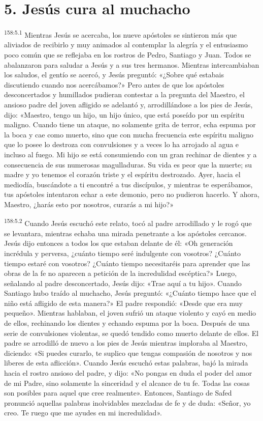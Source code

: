 \section*{5. Jesús cura al muchacho}
\par 
\textsuperscript{158:5.1} Mientras Jesús se acercaba, los nueve apóstoles se sintieron más que aliviados de recibirlo y muy animados al contemplar la alegría y el entusiasmo poco común que se reflejaba en los rostros de Pedro, Santiago y Juan. Todos se abalanzaron para saludar a Jesús y a sus tres hermanos. Mientras intercambiaban los saludos, el gentío se acercó, y Jesús preguntó: «¿Sobre qué estabais discutiendo cuando nos acercábamos?» Pero antes de que los apóstoles desconcertados y humillados pudieran contestar a la pregunta del Maestro, el ansioso padre del joven afligido se adelantó y, arrodillándose a los pies de Jesús, dijo: «Maestro, tengo un hijo, un hijo único, que está poseído por un espíritu maligno. Cuando tiene un ataque, no solamente grita de terror, echa espuma por la boca y cae como muerto, sino que con mucha frecuencia este espíritu maligno que lo posee lo destroza con convulsiones y a veces lo ha arrojado al agua e incluso al fuego. Mi hijo se está consumiendo con un gran rechinar de dientes y a consecuencia de sus numerosas magulladuras. Su vida es peor que la muerte; su madre y yo tenemos el corazón triste y el espíritu destrozado. Ayer, hacia el mediodía, buscándote a ti encontré a tus discípulos, y mientras te esperábamos, tus apóstoles intentaron echar a este demonio, pero no pudieron hacerlo. Y ahora, Maestro, ¿harás esto por nosotros, curarás a mi hijo?»

\par 
\textsuperscript{158:5.2} Cuando Jesús escuchó este relato, tocó al padre arrodillado y le rogó que se levantara, mientras echaba una mirada penetrante a los apóstoles cercanos. Jesús dijo entonces a todos los que estaban delante de él: «Oh generación incrédula y perversa, ¿cuánto tiempo seré indulgente con vosotros? ¿Cuánto tiempo estaré con vosotros? ¿Cuánto tiempo necesitaréis para aprender que las obras de la fe no aparecen a petición de la incredulidad escéptica?» Luego, señalando al padre desconcertado, Jesús dijo: «Trae aquí a tu hijo». Cuando Santiago hubo traído al muchacho, Jesús preguntó: «¿Cuánto tiempo hace que el niño está afligido de esta manera?» El padre respondió: «Desde que era muy pequeño». Mientras hablaban, el joven sufrió un ataque violento y cayó en medio de ellos, rechinando los dientes y echando espuma por la boca. Después de una serie de convulsiones violentas, se quedó tendido como muerto delante de ellos. El padre se arrodilló de nuevo a los pies de Jesús mientras imploraba al Maestro, diciendo: «Si puedes curarlo, te suplico que tengas compasión de nosotros y nos liberes de esta aflicción». Cuando Jesús escuchó estas palabras, bajó la mirada hacia el rostro ansioso del padre, y dijo: «No pongas en duda el poder del amor de mi Padre, sino solamente la sinceridad y el alcance de tu fe. Todas las cosas son posibles para aquel que cree realmente». Entonces, Santiago de Safed pronunció aquellas palabras inolvidables mezcladas de fe y de duda: «Señor, yo creo. Te ruego que me ayudes en mi incredulidad».

